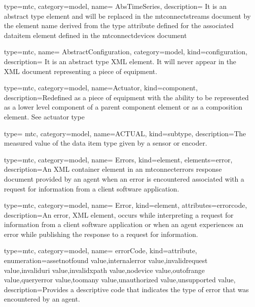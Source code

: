 

{
  type=mtc,
  category=model,
  name= {AbsTimeSeries},
  description= {It is an abstract type element and will be replaced in the \glspl{mtconnectstream} document by the element name derived from the \gls{type} attribute defined for the associated \gls{dataitem} element defined in the \glspl{mtconnectdevice} document}
}


{
  type=mtc,
  name= {AbstractConfiguration},
  category=model,
  kind={configuration},
  description= {It is an abstract type XML element.  It will never appear in the XML document representing a piece of equipment. }
}

{
  type=mtc,
  category=model,
  name={Actuator},
  kind={component},
  description={Redefined as a piece of equipment with the ability to be represented as a \gls{lower level} component of a parent \gls{component} element or as a \gls{composition} element. See \gls{actuator type}}
}

{
  type= mtc,
  category=model,
  name={ACTUAL},
  kind={subtype},
  description={The measured value of the data item type given by a sensor or encoder.}
}


{
  type=mtc,
  category=model,
  name= {Errors},
  kind={element},
  elements={\gls{error}},
  description={An XML container element in an \gls{mtconnecterrors response document} provided by an \gls{agent} when an error is encountered associated with a \gls{request} for information from a client software application.}
}

{
  type=mtc,
  category=model,
  name= {Error},
  kind={element},
  attributes={\gls{errorcode}},
  description={An \gls{error}, XML element, occurs while interpreting a \gls{request} for information from a client software application or when an \gls{agent} experiences an error while publishing the \gls{response} to a \gls{request} for information.}
}

{
  type=mtc,
  category=model,
  name= {errorCode},
  kind={attribute},
  enumeration={\gls{assetnotfound value},\gls{internalerror value},\gls{invalidrequest value},\gls{invaliduri value},\gls{invalidxpath value},\gls{nodevice value},\gls{outofrange value},\gls{queryerror value},\gls{toomany value},\gls{unauthorized value},\gls{unsupported value}},
  description={Provides a descriptive code that indicates the type of error that was encountered by an \gls{agent}.}
}


